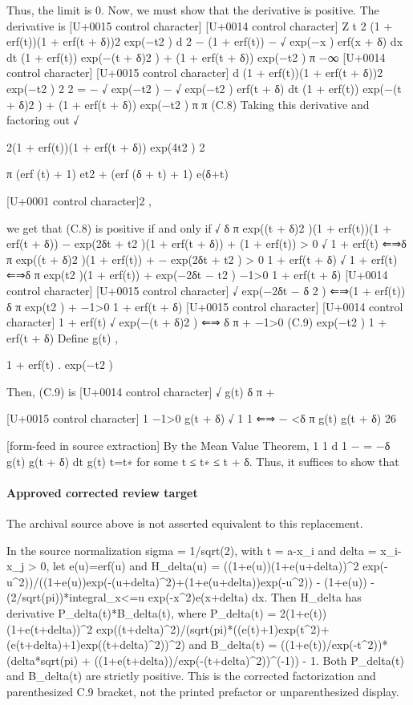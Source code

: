 \documentclass[10pt]{article}
\begin{document}
\begin{ReviewVerbatim}

Thus, the limit is 0. Now, we must show that the derivative is positive. The derivative is
[U+0015 control character]
[U+0014 control character]
Z t
2
(1 + erf(t))(1 + erf(t + δ))2 exp(−t2 )
d
2
− (1 + erf(t)) − √
exp(−x ) erf(x + δ) dx
dt (1 + erf(t)) exp(−(t + δ)2 ) + (1 + erf(t + δ)) exp(−t2 )
π −∞
[U+0014 control character]
[U+0015 control character]
d
(1 + erf(t))(1 + erf(t + δ))2 exp(−t2 )
2
2
=
− √ exp(−t2 ) − √ exp(−t2 ) erf(t + δ)
dt (1 + erf(t)) exp(−(t + δ)2 ) + (1 + erf(t + δ)) exp(−t2 )
π
π
(C.8)
Taking this derivative and factoring out
√

2(1 + erf(t))(1 + erf(t + δ)) exp(4t2 )
2

π (erf (t) + 1) et2 + (erf (δ + t) + 1) e(δ+t)

[U+0001 control character]2 ,

we get that (C.8) is positive if and only if
√
δ π exp((t + δ)2 )(1 + erf(t))(1 + erf(t + δ)) − exp(2δt + t2 )(1 + erf(t + δ)) + (1 + erf(t)) > 0
√
1 + erf(t)
⇐⇒δ π exp((t + δ)2 )(1 + erf(t)) +
− exp(2δt + t2 ) > 0
1 + erf(t + δ)
√
1 + erf(t)
⇐⇒δ π exp(t2 )(1 + erf(t)) + exp(−2δt − t2 )
−1>0
1 + erf(t + δ)
[U+0014 control character]
[U+0015 control character]
√
exp(−2δt − δ 2 )
⇐⇒(1 + erf(t)) δ π exp(t2 ) +
−1>0
1 + erf(t + δ)
[U+0015 control character]
[U+0014 control character]
1 + erf(t) √
exp(−(t + δ)2 )
⇐⇒
δ
π
+
−1>0
(C.9)
exp(−t2 )
1 + erf(t + δ)
Define
g(t) ,

1 + erf(t)
.
exp(−t2 )

Then, (C.9) is
[U+0014 control character]
√
g(t) δ π +

[U+0015 control character]
1
−1>0
g(t + δ)
√
1
1
⇐⇒
−
<δ π
g(t) g(t + δ)
26


[form-feed in source extraction]
By the Mean Value Theorem,
1
1
d 1
−
= −δ
g(t) g(t + δ)
dt g(t) t=t∗
for some t ≤ t∗ ≤ t + δ. Thus, it suffices to show that
\end{ReviewVerbatim}

\paragraph{Approved corrected review target}
The archival source above is not asserted equivalent to this replacement.
\begin{ReviewVerbatim}
In the source normalization sigma = 1/sqrt(2), with t = a-x_i and delta = x_i-x_j > 0, let e(u)=erf(u) and H_delta(u) = ((1+e(u))(1+e(u+delta))^2 exp(-u^2))/((1+e(u))exp(-(u+delta)^2)+(1+e(u+delta))exp(-u^2)) - (1+e(u)) - (2/sqrt(pi))*integral_{x<=u} exp(-x^2)e(x+delta) dx. Then H_delta has derivative P_delta(t)*B_delta(t), where P_delta(t) = 2(1+e(t))(1+e(t+delta))^2 exp((t+delta)^2)/(sqrt(pi)*((e(t)+1)exp(t^2)+(e(t+delta)+1)exp((t+delta)^2))^2) and B_delta(t) = ((1+e(t))/exp(-t^2))*(delta*sqrt(pi) + ((1+e(t+delta))/exp(-(t+delta)^2))^(-1)) - 1. Both P_delta(t) and B_delta(t) are strictly positive. This is the corrected factorization and parenthesized C.9 bracket, not the printed prefactor or unparenthesized display.
\end{ReviewVerbatim}
\end{document}
